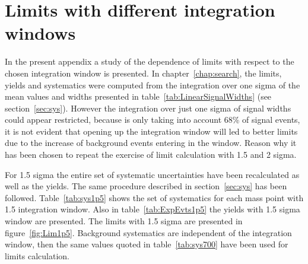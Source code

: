 \chapter{Limits with different integration windows}
\label{chap:windstudy}

In the present appendix a study of the dependence of limits with respect to the chosen integration window is presented. In chapter~\ref{chap:search}, the limits, yields and systematics were computed from the integration over one sigma of the mean values and widths presented in table~\ref{tab:LinearSignalWidths} (see section~\ref{sec:sys}). However the integration over just one sigma of signal widths could appear restricted, because is only taking into account 68\% of signal events, it is not evident that opening up the integration window will led to better limits due to the increase of background events entering in the window. Reason why it has been chosen to repeat the exercise of limit calculation with 1.5 and 2 sigma.

For 1.5 sigma the entire set of systematic uncertainties have been recalculated as well as the yields. The same procedure described in section~\ref{sec:sys} has been followed. Table~\ref{tab:sys1p5} shows the set of systematics for each mass point with 1.5 integration window. Also in table~\ref{tab:ExpEvts1p5} the yields with 1.5 sigma window are presented. The limits with 1.5 sigma are presented in figure~\ref{fig:Lim1p5}. Background systematics are independent of the integration window, then the same values quoted in table~\ref{tab:sys700} have been used for limits calculation.

